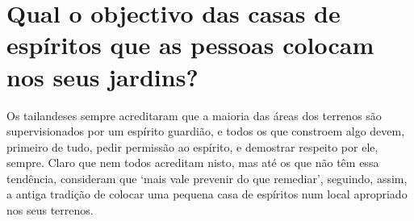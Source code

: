 \section{Qual o objectivo das casas de espíritos que as pessoas colocam nos seus
  jardins?}

Os tailandeses sempre acreditaram que a maioria das áreas dos terrenos
são supervisionados por um espírito guardião, e todos os que constroem
algo devem, primeiro de tudo, pedir permissão ao espírito, e demostrar
respeito por ele, sempre. Claro que nem todos acreditam nisto, mas até
os que não têm essa tendência, consideram que `mais vale prevenir do
que remediar', seguindo, assim, a antiga tradição de colocar uma
pequena casa de espíritos num local apropriado nos seus terrenos.
